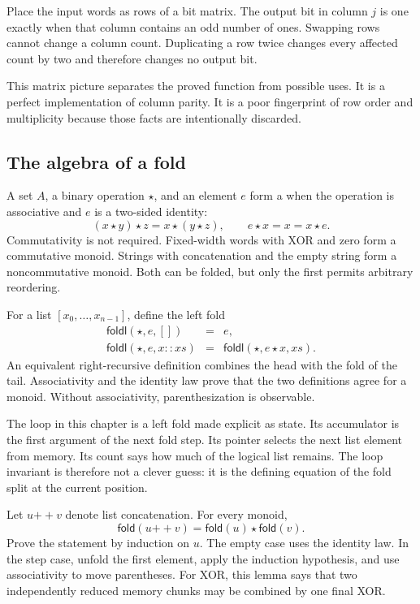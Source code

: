 \begin{example}[title={The reduction is a column of parity checks}]
Place the input words as rows of a bit matrix. The output bit in column \(j\)
is one exactly when that column contains an odd number of ones. Swapping rows
cannot change a column count. Duplicating a row twice changes every affected
count by two and therefore changes no output bit.
\end{example}

This matrix picture separates the proved function from possible uses. It is a
perfect implementation of column parity. It is a poor fingerprint of row
order and multiplicity because those facts are intentionally discarded.

\subsection{The algebra of a fold}

A set \(A\), a binary operation \(\star\), and an element \(e\) form a
 when the operation is associative and \(e\) is a two-sided
identity:
\[
 (x\star y)\star z=x\star(y\star z),
 \qquad e\star x=x=x\star e.
\]
Commutativity is not required. Fixed-width words with XOR and zero form a
commutative monoid. Strings with concatenation and the empty string form a
noncommutative monoid. Both can be folded, but only the first permits arbitrary
reordering.

For a list \([x_0,\ldots,x_{n-1}]\), define the left fold
\[
 \begin{array}{rcl}
 \mathsf{foldl}(\star,e,[])&=&e,\\
 \mathsf{foldl}(\star,e,x::xs)&=&
   \mathsf{foldl}(\star,e\star x,xs).
 \end{array}
\]
An equivalent right-recursive definition combines the head with the fold of
the tail. Associativity and the identity law prove that the two definitions
agree for a monoid. Without associativity, parenthesization is observable.

The loop in this chapter is a left fold made explicit as state. Its
accumulator is the first argument of the next fold step. Its pointer selects
the next list element from memory. Its count says how much of the logical list
remains. The loop invariant is therefore not a clever guess: it is the
defining equation of the fold split at the current position.

\begin{proofkit}[title={The fold-splitting lemma}]
Let \(u\mathbin{+\!+}v\) denote list concatenation. For every monoid,
\[
 \mathsf{fold}(u\mathbin{+\!+}v)
 =\mathsf{fold}(u)\star\mathsf{fold}(v).
\]
Prove the statement by induction on \(u\). The empty case uses the identity
law. In the step case, unfold the first element, apply the induction
hypothesis, and use associativity to move parentheses. For XOR, this lemma
says that two independently reduced memory chunks may be combined by one
final XOR.
\end{proofkit}

